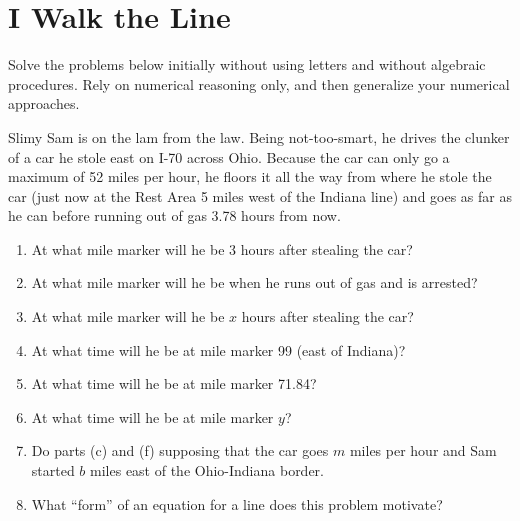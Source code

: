 \newpage
\section{I Walk the Line}\label{A:walk}
Solve the problems below initially without using letters and without algebraic procedures.  Rely on numerical reasoning only, and then generalize your numerical approaches.  

\begin{prob}
Slimy Sam is on the lam from the law.  Being not-too-smart, he drives
the clunker of a car he stole east on I-70 across Ohio.  Because the
car can only go a maximum of 52 miles per hour, he floors it all the
way from where he stole the car (just now at the Rest Area 5 miles
west of the Indiana line) and goes as far as he can before running out
of gas 3.78 hours from now.

\begin{enumerate}
\item At what mile marker will he be 3 hours after stealing the car?
\item At what mile marker will he be when he runs out of gas and is
  arrested?
\item At what mile marker will he be $x$ hours after
  stealing the car?
\item At what time will he be at mile marker 99 (east of Indiana)?
\item At what time will he be at mile marker 71.84?
\item At what time will he be at mile marker $y$?
\item Do parts (c) and (f) supposing that the car
  goes $m$ miles per hour and Sam started $b$ miles east of the
  Ohio-Indiana border.
\item What ``form'' of an equation for a line does this problem
  motivate?
\end{enumerate}
\end{prob}

